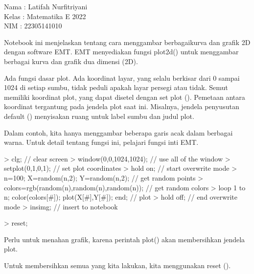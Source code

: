\documentclass[a4paper,10pt]{article}
\begin{document}
\begin{eulernotebook}
\begin{eulercomment}
Nama  : Latifah Nurfitriyani\\
Kelas : Matematika E 2022\\
NIM   : 22305141010\\
\end{eulercomment}
\eulersubheading{}
\begin{eulercomment}
\begin{eulercomment}
\begin{eulercomment}
Notebook ini menjelaskan tentang cara menggambar berbagaikurva dan
grafik 2D dengan software EMT. EMT menyediakan fungsi plot2d() untuk
menggambar berbagai kurva dan grafik dua dimensi (2D).\\
\end{eulercomment}
\begin{eulercomment}
Ada fungsi dasar plot. Ada koordinat layar, yang selalu berkisar dari
0 sampai 1024 di setiap sumbu, tidak peduli apakah layar persegi atau
tidak. Semut memiliki koordinat plot, yang dapat disetel dengan set
plot (). Pemetaan antara koordinat tergantung pada jendela plot saat
ini. Misalnya, jendela penyusutan default () menyisakan ruang untuk
label sumbu dan judul plot.

Dalam contoh, kita hanya menggambar beberapa garis acak dalam berbagai
warna. Untuk detail tentang fungsi ini, pelajari fungsi inti EMT.
\end{eulercomment}
\begin{eulerprompt}
> clg; // clear screen
> window(0,0,1024,1024); // use all of the window
> setplot(0,1,0,1); // set plot coordinates
> hold on; // start overwrite mode
> n=100; X=random(n,2); Y=random(n,2);  // get random points
> colors=rgb(random(n),random(n),random(n)); // get random colors
> loop 1 to n; color(colors[#]); plot(X[#],Y[#]); end; // plot
> hold off; // end overwrite mode
> insimg; // insert to notebook
\end{eulerprompt}
\begin{eulerprompt}
> reset;
\end{eulerprompt}
\begin{eulercomment}
Perlu untuk menahan grafik, karena perintah plot() akan membersihkan
jendela plot.

Untuk membersihkan semua yang kita lakukan, kita menggunakan reset ().


\end{eulercomment}
\end{eulercomment}
\end{eulercomment}
\end{eulernotebook}
\end{document}
